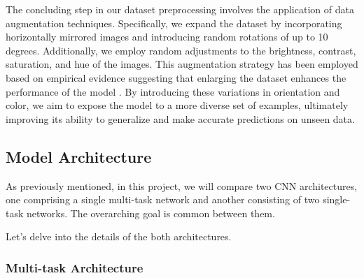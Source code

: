 The concluding step in our dataset preprocessing involves the application
of data augmentation techniques. Specifically, we expand the dataset
by incorporating horizontally mirrored images and introducing random
rotations of up to 10 degrees. Additionally, we employ random adjustments
to the brightness, contrast, saturation, and hue of the images.
This augmentation strategy has been employed based on empirical
evidence suggesting that enlarging the dataset enhances the performance
of the model \cite{app4}. By introducing these variations in orientation and color,
we aim to expose the model to a more diverse set of examples,
ultimately improving its ability to generalize and make accurate
predictions on unseen data.

\subsection{Model Architecture} \label{sec:model}

As previously mentioned, in this project, we will compare two
CNN architectures, one comprising a single multi-task
network and another consisting of two single-task networks.
The overarching goal is common between them.

Let's delve into the details of the both architectures.

\subsubsection{Multi-task Architecture} \label{sec:multi}

